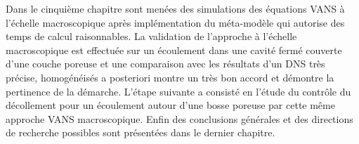 Dans le cinquième chapitre sont menées des simulations des équations VANS à l’échelle macroscopique après implémentation du méta-modèle qui autorise des temps de calcul raisonnables.  La validation de l’approche à l’échelle macroscopique est effectuée sur un écoulement dans une cavité fermé couverte d’une couche poreuse et une comparaison avec les résultats d’un DNS très précise, homogénéisés a posteriori montre un très bon accord et démontre la pertinence de la démarche. L’étape suivante a consisté en l’étude du contrôle du décollement pour un écoulement autour d’une bosse poreuse par cette même approche VANS macroscopique. Enfin des conclusions générales et des directions de recherche possibles sont présentées dans le dernier chapitre.